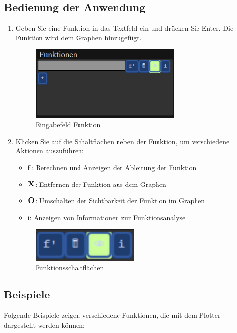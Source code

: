 \documentclass[a4paper]{article}
\begin{document}
\subsection{Bedienung der Anwendung}
\begin{enumerate}
	\item Geben Sie eine Funktion in das Textfeld ein und drücken Sie Enter. Die Funktion wird dem Graphen hinzugefügt.
	      \begin{figure}[ht]
		      \centering
		      \includegraphics[width=0.7\textwidth]{Resources/example_function.png}
		      \caption{Eingabefeld Funktion}
		      \label{fig:example_function}
	      \end{figure}
	      \newpage
	\item Klicken Sie auf die Schaltflächen neben der Funktion, um verschiedene Aktionen auszuführen:
	      \begin{itemize}
		      \item f': Berechnen und Anzeigen der Ableitung der Funktion
		      \item \(\mathrm{\large{\textbf{X}}}\): Entfernen der Funktion aus dem Graphen
		      \item \(\mathrm{\large{\textbf{O}}}\): Umschalten der Sichtbarkeit der Funktion im Graphen
		      \item i: Anzeigen von Informationen zur Funktionsanalyse
	      \end{itemize}
	      \begin{figure}[ht]
		      \centering
		      \includegraphics[width=0.5\textwidth]{Resources/example_buttons.png}
		      \caption{Funktionsschaltflächen}
		      \label{fig:example_buttons}
	      \end{figure}
\end{enumerate}

\subsection{Beispiele}
Folgende Beispiele zeigen verschiedene Funktionen, die mit dem Plotter dargestellt werden können:
\end{document}
